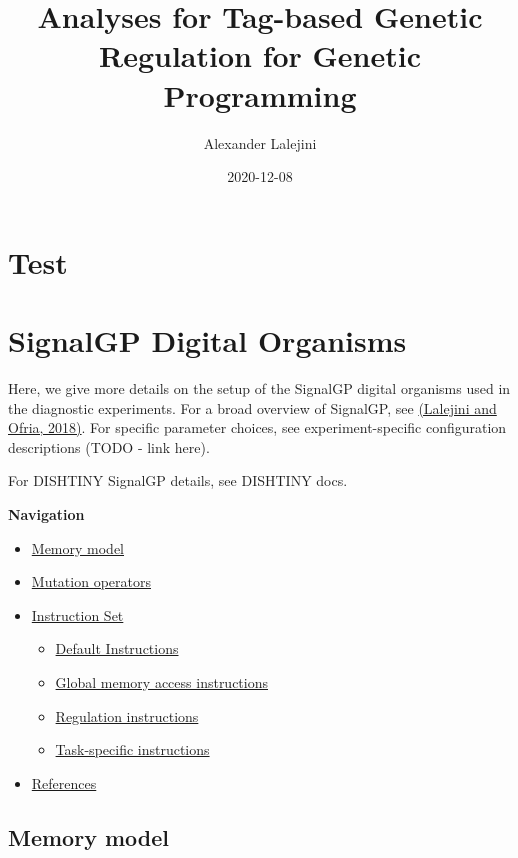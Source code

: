 \documentclass[
]{book}
\title{Analyses for Tag-based Genetic Regulation for Genetic Programming}
\author{Alexander Lalejini}
\date{2020-12-08}
\providecommand{\tightlist}{%
  \setlength{\itemsep}{0pt}\setlength{\parskip}{0pt}}
\begin{document}
\maketitle

{
\setcounter{tocdepth}{1}
\tableofcontents
}
\hypertarget{test}{%
\chapter{Test}\label{test}}

\hypertarget{signalgp-digital-organisms}{%
\chapter{SignalGP Digital Organisms}\label{signalgp-digital-organisms}}

Here, we give more details on the setup of the SignalGP digital organisms used in the diagnostic
experiments. For a broad overview of SignalGP, see \href{https://doi.org/10.1145/3205455.3205523}{(Lalejini and Ofria, 2018)}. For specific parameter choices, see experiment-specific configuration descriptions (TODO - link here).

For DISHTINY SignalGP details, see DISHTINY docs.

\textbf{Navigation}

\begin{itemize}
\tightlist
\item
  \protect\hyperlink{memory-model}{Memory model}
\item
  \protect\hyperlink{mutation-operators}{Mutation operators}
\item
  \protect\hyperlink{instruction-set}{Instruction Set}

  \begin{itemize}
  \tightlist
  \item
    \protect\hyperlink{default-instructions}{Default Instructions}
  \item
    \protect\hyperlink{global-memory-access-instructions}{Global memory access instructions}
  \item
    \protect\hyperlink{regulation-instructions}{Regulation instructions}
  \item
    \protect\hyperlink{task-specific-instructions}{Task-specific instructions}
  \end{itemize}
\item
  \protect\hyperlink{references}{References}
\end{itemize}

\hypertarget{memory-model}{%
\section{Memory model}\label{memory-model}}
\end{document}
